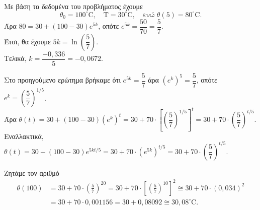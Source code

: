 \begin{alist}
\item Με βάση τα δεδομένα του προβλήματος έχουμε
\[\theta_0 = 100^\circ\text{C}, \quad \text{T} = 30^\circ\text{C}, \quad \text{ενώ } \theta(5) = 80^\circ\text{C}.\]
Άρα $80 = 30 + (100 - 30)e^{5k}$, οπότε $e^{5k} = \dfrac{50}{70} = \dfrac{5}{7}$. \\
Έτσι, θα έχουμε $5k = \ln\left(\dfrac{5}{7}\right)$. \\
Τελικά, $k = \dfrac{-0,336}{5} = -0,0672$.
\item Στο προηγούμενο ερώτημα βρήκαμε ότι $e^{5k} = \dfrac{5}{7}$ άρα $(e^k)^5 = \dfrac{5}{7}$, οπότε $e^k = \left(\dfrac{5}{7}\right)^{1/5}$. \\
Άρα $\theta(t) = 30 + (100 - 30)(e^k)^t = 30 + 70 \cdot \left[\left(\dfrac{5}{7}\right)^{1/5}\right]^t = 30 + 70 \cdot \left(\dfrac{5}{7}\right)^{t/5}$. \\
Εναλλακτικά, $\theta(t) = 30 + (100 - 30)e^{5kt/5} = 30 + 70 \cdot (e^{5k})^{t/5} = 30 + 70 \cdot \left(\dfrac{5}{7}\right)^{t/5}$.
\item Ζητάμε τον αριθμό 
\begin{align*}
\theta(100) &= 30 + 70 \cdot \left(\frac{5}{7}\right)^{20} = 30 + 70 \cdot \left[\left(\frac{5}{7}\right)^{10}\right]^2 \cong 30 + 70 \cdot (0,034)^2 \\
&= 30 + 70 \cdot 0,001156 = 30 + 0,08092 \cong 30,08^\circ\text{C}.
\end{align*}
\end{alist}

